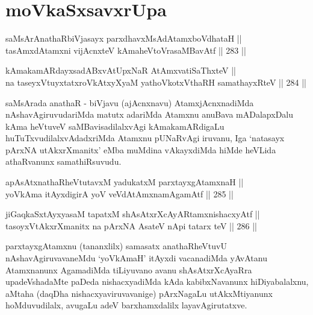 \section*{moVkaSxsavxrUpa}

\begin{shl}
saMsArAnathaRbiVjasayx parxdhavxMsAdAtamxboVdhataH || \\
tasAmxdAtamxni vijAcnxteV kAmaheVtoVrasaMBavAtf \hfill || 283 ||  
\end{shl}

\begin{shl}
kAmakamARdayxsadABxvAtUpxNaR AtAmx\s vatiSaThxteV ||  \\
na taseyxVtuyxtatxroVkAtxyX\s yaM yathoVkotxV\s thaRH samathayxRteV \hfill || 284 ||  
\end{shl}

\begin{artha}
saMsArada anathaR - biVjavu (ajAcnxnavu) AtamxjAcnxnadiMda
nAshavAgiruvudariMda matutx adariMda Atamxnu anuBava mADalapxDalu kAma
heVtuveV saMBavisadilalxvAgi kAmakamARdigaLu huTuTxvudilalxvAdadxriMda
Atamxnu pUNaRvAgi iruvanu, Iga `natasayx pArxNA utAkxrXmanitx' eMba
muMdina vAkayxdiMda hiMde heVLida athaRvanunx samathiRsuvudu.
\end{artha}

\begin{shl}
apAsAtxnathaRheVtutavxM yadukatxM parxtayxgAtamxnaH || \\
yoV\s kAma itAyxdigirA yoV veVdA\s \s tAmxnamAgamAtf \hfill || 285 ||  
\end{shl}

\begin{shl}
jiGaqkaSxtAyxyasaM tapatxM shAsAtxrXcAyARtamxnishacxyAtf ||  \\
tasoyxVtAkxrXmanitx na pArxNA AsateV nApi tatarx teV \hfill || 286 ||  
\end{shl}

\begin{artha}
parxtayxgAtamxnu (tananxlilx) samasatx anathaRheVtuvU
nAshavAgiruvavaneMdu `yoV\s kAmaH' itAyxdi vacanadiMda yAvAtanu
Atamxnanunx AgamadiMda tiLiyuvano avanu shAsAtxrXcAyaRra
upadeVshadaMte paDeda nishacxyadiMda kAda kabibxNavanunx
hiDiyabalalxnu, aMtaha (daqDha nishacxyaviruvavanige) pArxNagaLu
utAkxMtiyanunx hoMduvudilalx, avugaLu adeV barxhamxdalilx
layavAgirutatxve.
\end{artha}


